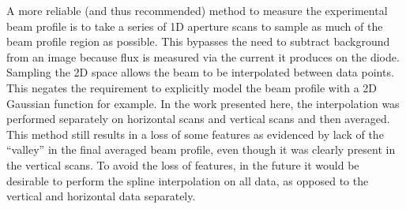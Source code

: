 A more reliable (and thus recommended) method to measure the experimental beam profile is to take a series of 1D aperture scans to sample as much of the beam profile region as possible.
This bypasses the need to subtract background from an image because flux is measured via the current it produces on the diode.
Sampling the 2D space allows the beam to be interpolated between data points.
This negates the requirement to explicitly model the beam profile with a 2D Gaussian function for example.
In the work presented here, the interpolation was performed separately on horizontal scans and vertical scans and then averaged.
This method still results in a loss of some features as evidenced by lack of the ``valley'' in the final averaged beam profile, even though it was clearly present in the vertical scans.
To avoid the loss of features, in the future it would be desirable to perform the spline interpolation on all data, as opposed to the vertical and horizontal data separately.
